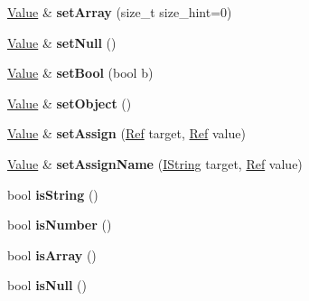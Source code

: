 \begin{DoxyCompactItemize}
\mbox{\hyperlink{structcashew_1_1_value}{Value}} \& {\bfseries set\+Array} (size\+\_\+t size\+\_\+hint=0)
\item 
\mbox{\label{structcashew_1_1_value_aec42580acf3503308431beb86e592ddc}} 
\mbox{\hyperlink{structcashew_1_1_value}{Value}} \& {\bfseries set\+Null} ()
\item 
\mbox{\label{structcashew_1_1_value_a0ce3b9d3957f2f801360e699fd1b9b99}} 
\mbox{\hyperlink{structcashew_1_1_value}{Value}} \& {\bfseries set\+Bool} (bool b)
\item 
\mbox{\label{structcashew_1_1_value_aa35816a541bb599393e40b8563b01f1a}} 
\mbox{\hyperlink{structcashew_1_1_value}{Value}} \& {\bfseries set\+Object} ()
\item 
\mbox{\label{structcashew_1_1_value_aed24a4771ecad5b7b9fc6c3ea7e9b1f3}} 
\mbox{\hyperlink{structcashew_1_1_value}{Value}} \& {\bfseries set\+Assign} (\mbox{\hyperlink{structcashew_1_1_ref}{Ref}} target, \mbox{\hyperlink{structcashew_1_1_ref}{Ref}} value)
\item 
\mbox{\label{structcashew_1_1_value_a491b2f44e505063b5d4b5b70bae68253}} 
\mbox{\hyperlink{structcashew_1_1_value}{Value}} \& {\bfseries set\+Assign\+Name} (\mbox{\hyperlink{structcashew_1_1_i_string}{I\+String}} target, \mbox{\hyperlink{structcashew_1_1_ref}{Ref}} value)
\item 
\mbox{\label{structcashew_1_1_value_a39a24106b24b3e450ec909ac715efef3}} 
bool {\bfseries is\+String} ()
\item 
\mbox{\label{structcashew_1_1_value_a9c0a95067fe68b714870444f71a313ac}} 
bool {\bfseries is\+Number} ()
\item 
\mbox{\label{structcashew_1_1_value_a2adc0ac116aa7db842c61a468252a5f8}} 
bool {\bfseries is\+Array} ()
\item 
\mbox{\label{structcashew_1_1_value_ad7e7e3c8edb9eacaf08c61976ea8c75a}} 
bool {\bfseries is\+Null} ()
\item 

\end{DoxyCompactItemize}
